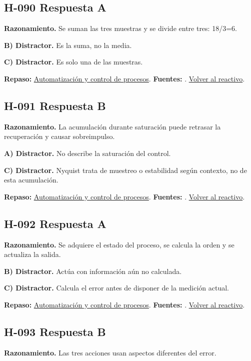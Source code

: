 \subsection*{H-090 \quad Respuesta A}\label{s:H-090}
\textbf{Razonamiento.} Se suman las tres muestras y se divide entre tres: 18/3=6.

\textbf{B) Distractor. }Es la suma, no la media.

\textbf{C) Distractor. }Es solo una de las muestras.

\textbf{Repaso:} \hyperref[sec:h4]{Automatización y control de procesos}. \textbf{Fuentes:} \cite{control,signals,pid}. \hyperref[q:H-090]{Volver al reactivo}.\par\medskip

\subsection*{H-091 \quad Respuesta B}\label{s:H-091}
\textbf{Razonamiento.} La acumulación durante saturación puede retrasar la recuperación y causar sobreimpulso.

\textbf{A) Distractor. }No describe la saturación del control.

\textbf{C) Distractor. }Nyquist trata de muestreo o estabilidad según contexto, no de esta acumulación.

\textbf{Repaso:} \hyperref[sec:h4]{Automatización y control de procesos}. \textbf{Fuentes:} \cite{control,signals,pid}. \hyperref[q:H-091]{Volver al reactivo}.\par\medskip

\subsection*{H-092 \quad Respuesta A}\label{s:H-092}
\textbf{Razonamiento.} Se adquiere el estado del proceso, se calcula la orden y se actualiza la salida.

\textbf{B) Distractor. }Actúa con información aún no calculada.

\textbf{C) Distractor. }Calcula el error antes de disponer de la medición actual.

\textbf{Repaso:} \hyperref[sec:h4]{Automatización y control de procesos}. \textbf{Fuentes:} \cite{control,signals,pid}. \hyperref[q:H-092]{Volver al reactivo}.\par\medskip

\subsection*{H-093 \quad Respuesta B}\label{s:H-093}
\textbf{Razonamiento.} Las tres acciones usan aspectos diferentes del error.

